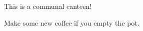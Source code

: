 \documentclass{article}
\begin{document}

\maketitle

\begin{center}
  \fontsize{72}{18}\selectfont
  This is a communal canteen!

\vspace{2cm}

  \fontsize{48}{18}\selectfont
  Make some new coffee if you empty the pot.
\end{center}

\underskriv
\end{document}
